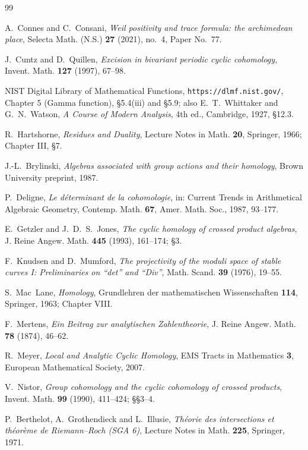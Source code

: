 \documentclass[11pt]{amsart}
\theoremstyle{definition}
\theoremstyle{remark}
\begin{document}
\begin{thebibliography}{99}

A.~Connes and C.~Consani, \emph{Weil positivity and trace formula: the
archimedean place}, Selecta Math. (N.S.) \textbf{27} (2021), no.~4, Paper
No.~77.

J.~Cuntz and D.~Quillen, \emph{Excision in bivariant periodic cyclic
cohomology}, Invent. Math. \textbf{127} (1997), 67--98.

NIST Digital Library of Mathematical Functions, \texttt{https://dlmf.nist.gov/},
Chapter 5 (Gamma function), \S5.4(iii) and \S5.9; also E.~T.~Whittaker and
G.~N.~Watson, \emph{A Course of Modern Analysis}, 4th ed., Cambridge, 1927,
\S12.3.

R.~Hartshorne, \emph{Residues and Duality}, Lecture Notes in Math. \textbf{20},
Springer, 1966; Chapter III, \S7.

J.-L.~Brylinski, \emph{Algebras associated with group actions and their
homology}, Brown University preprint, 1987.

P.~Deligne, \emph{Le d\'eterminant de la cohomologie}, in: Current Trends in
Arithmetical Algebraic Geometry, Contemp. Math. \textbf{67}, Amer. Math. Soc.,
1987, 93--177.

E.~Getzler and J.~D.~S.~Jones, \emph{The cyclic homology of crossed product
algebras}, J. Reine Angew. Math. \textbf{445} (1993), 161--174; \S3.

F.~Knudsen and D.~Mumford, \emph{The projectivity of the moduli space of stable
curves I: Preliminaries on ``det'' and ``Div''}, Math. Scand. \textbf{39}
(1976), 19--55.

S.~Mac~Lane, \emph{Homology}, Grundlehren der mathematischen Wissenschaften
\textbf{114}, Springer, 1963; Chapter VIII.

F.~Mertens, \emph{Ein Beitrag zur analytischen Zahlentheorie},
J. Reine Angew. Math. \textbf{78} (1874), 46--62.

R.~Meyer, \emph{Local and Analytic Cyclic Homology}, EMS Tracts in Mathematics
\textbf{3}, European Mathematical Society, 2007.

V.~Nistor, \emph{Group cohomology and the cyclic cohomology of crossed
products}, Invent. Math. \textbf{99} (1990), 411--424; \S\S3--4.

P.~Berthelot, A.~Grothendieck and L.~Illusie, \emph{Th\'eorie des intersections
et th\'eor\`eme de Riemann--Roch (SGA 6)}, Lecture Notes in Math. \textbf{225},
Springer, 1971.


\end{thebibliography}
\end{document}
